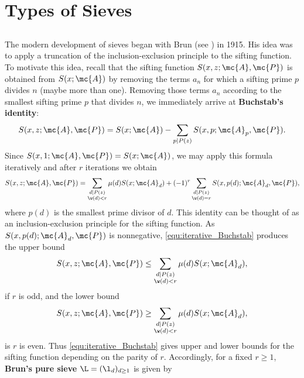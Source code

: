 \chapter{Types of Sieves}
  \section{}
    The modern development of sieves began with Brun (see \cite{brun1915uber}) in 1915. His idea was to apply a truncation of the inclusion-exclusion principle to the sifting function. To motivate this idea, recall that the sifting function $S(x,z;\mc{A},\mc{P})$ is obtained from $S(x;\mc{A})$ by removing the terms $a_{n}$ for which a sifting prime $p$ divides $n$ (maybe more than one). Removing those terms $a_{n}$ according to the smallest sifting prime $p$ that divides $n$, we immediately arrive at \textbf{Buchstab's identity}:
    \[
      S(x,z;\mc{A},\mc{P}) = S(x;\mc{A})-\sum_{p \mid P(z)}S(x,p;\mc{A}_{p},\mc{P}).
    \]
    Since $S(x,1;\mc{A},\mc{P}) = S(x;\mc{A})$, we may apply this formula iteratively and after $r$ iterations we obtain
    \begin{equation}\label{equ:iterative_Buchstab}
      S(x,z;\mc{A},\mc{P}) = \sum_{\substack{d \mid P(z) \\ \w(d) < r}}\mu(d)S(x;\mc{A}_{d})+(-1)^{r}\sum_{\substack{d \mid P(z) \\ \w(d) = r}}S(x,p(d);\mc{A}_{d},\mc{P}),
    \end{equation}
    where $p(d)$ is the smallest prime divisor of $d$. This identity can be thought of as an inclusion-exclusion principle for the sifting function. As $S(x,p(d);\mc{A}_{d},\mc{P})$ is nonnegative, \cref{equ:iterative_Buchstab} produces the upper bound
    \begin{equation}\label{equ:iterative_Buchstab_odd}
      S(x,z;\mc{A},\mc{P}) \le \sum_{\substack{d \mid P(z) \\ \w(d) < r}}\mu(d)S(x;\mc{A}_{d}),
    \end{equation}
    if $r$ is odd, and the lower bound
    \begin{equation}\label{equ:iterative_Buchstab_even}
      S(x,z;\mc{A},\mc{P}) \ge \sum_{\substack{d \mid P(z) \\ \w(d) < r}}\mu(d)S(x;\mc{A}_{d}),
    \end{equation}
    is $r$ is even. Thus \cref{equ:iterative_Buchstab} gives upper and lower bounds for the sifting function depending on the parity of $r$. Accordingly, for a fixed $r \ge 1$, \textbf{Brun's pure sieve} $\L = (\l_{d})_{d \ge 1}$ is given by
